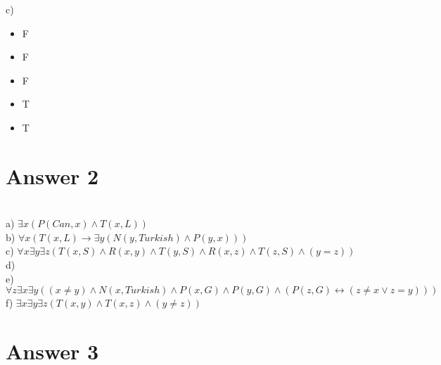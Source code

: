 \documentclass[12pt]{article}
\begin{document}
c)\\
\begin{itemize}
\centering
    \item F
    \item F
    \item F
    \item T
    \item T
\end{itemize}

\section*{Answer 2}

\hspace{5mm} \\
\hspace{5mm} a) $ \exists x (P(Can,x) \wedge T(x,L)) $\\
\hspace{5mm} b) $ \forall x (T(x,L) \rightarrow \exists y(N(y,Turkish) \wedge P(y,x))) $\\
\hspace{5mm} c) $ \forall x \exists y \exists z (T(x,S) \wedge R(x,y) \wedge T(y,S) \wedge R(x,z) \wedge T(z,S) \wedge (y=z))$\\
\hspace{5mm} d) \\
\hspace{5mm} e) $\forall z \exists x \exists y ((x \not=y) \wedge N(x,Turkish) \wedge P(x,G) \wedge P(y,G) \wedge (P(z,G) \leftrightarrow (z \not=x  \lor z=y )))$\\
\hspace{5mm} f) $ \exists x \exists y \exists z (T(x,y) \wedge T(x,z) \wedge (y \not=z))$\\


\section*{Answer 3}
\end{document}
